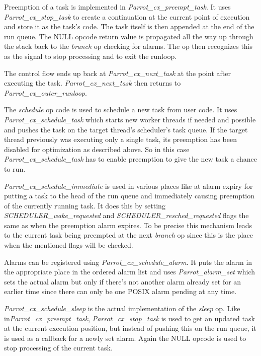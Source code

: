 \documentclass[bachelor,english]{hgbthesis}
\begin{document}
Preemption of a task is implemented in \textit{Parrot\_cx\_preempt\_task}. It uses \textit{Parrot\_cx\_stop\_task} to create a continuation at the current point of execution and store it as the task's code. The task itself is then appended at the end of the run queue. The NULL opcode return value is propagated all the way up through the stack back to the \textit{branch} op checking for alarms. The op then recognizes this as the signal to stop processing and to exit the runloop.

The control flow ends up back at \textit{Parrot\_cx\_next\_task} at the point after executing the task. \textit{Parrot\_cx\_next\_task} then returns to \textit{Parrot\_cx\_outer\_runloop}.

The \textit{schedule} op code is used to schedule a new task from user code. It uses \textit{Parrot\_cx\_schedule\_task} which starts new worker threads if needed and possible and pushes the task on the target thread's scheduler's task queue. If the target thread previously was executing only a single task, its preemption has been disabled for optimization as described above. So in this case \textit{Parrot\_cx\_schedule\_task} has to enable preemption to give the new task a chance to run.

\textit{Parrot\_cx\_schedule\_immediate} is used in various places like at alarm expiry for putting a task to the head of the run queue and immediately causing preemption of the currently running task. It does this by setting \textit{SCHEDULER\_wake\_requested} and \textit{SCHEDULER\_resched\_requested} flags the same as when the preemption alarm expires. To be precise this mechanism leads to the current task being preempted at the next \textit{branch} op since this is the place when the mentioned flags will be checked.

Alarms can be registered using \textit{Parrot\_cx\_schedule\_alarm}. It puts the alarm in the appropriate place in the ordered alarm list and uses \textit{Parrot\_alarm\_set} which sets the actual alarm but only if there's not another alarm already set for an earlier time since there can only be one POSIX alarm pending at any time.

\textit{Parrot\_cx\_schedule\_sleep} is the actual implementation of the \textit{sleep} op. Like in\textit{Parrot\_cx\_preempt\_task}, \textit{Parrot\_cx\_stop\_task} is used to get an updated task at the current execution position, but instead of pushing this on the run queue, it is used as a callback for a newly set alarm. Again the NULL opcode is used to stop processing of the current task.
\end{document}

